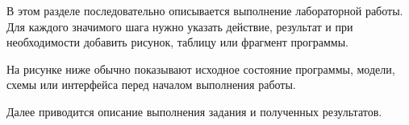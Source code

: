 \labwork

В этом разделе последовательно описывается выполнение лабораторной работы.
Для каждого значимого шага нужно указать действие, результат и при необходимости
добавить рисунок, таблицу или фрагмент программы.

На рисунке ниже обычно показывают исходное состояние программы, модели,
схемы или интерфейса перед началом выполнения работы.


Далее приводится описание выполнения задания и полученных результатов.


